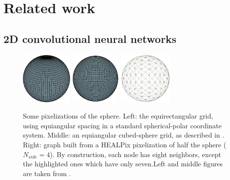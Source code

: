 \documentclass[final,twocolumn,3p,times,sort&compress]{elsarticle}
\newcommand{\1}{\b{1}}              %
\newcommand{\0}{\b{0}}              %
\begin{document}
\section{Related work}
\label{sec:related_work}

\subsection{2D convolutional neural networks}

\begin{figure}
    \centering
    \includegraphics[height=7em]{sphere_grid_equirectangular}
    \hfill
    \includegraphics[height=7em]{sphere_grid_cubedsphere}
    \hfill
    \includegraphics[height=7em]{half_graph_4}
    \caption[]{Some pixelizations of the sphere. Left: the equirectangular grid, using equiangular spacing in a standard spherical-polar coordinate system. Middle: an equiangular cubed-sphere grid, as described in \citep{ronchi1996cubed}. Right: graph built from a HEALPix pixelization of half the sphere ($N_{side} = 4$). By construction, each node has eight neighbors, except the highlighted ones which have only seven.\footnotemark[4] Left and middle figures are taken from \citep{boomsma2017spherical}.}
    \label{fig:sphere_grids}
    \label{fig:healpix_graph_4}
\end{figure}
\end{document}
